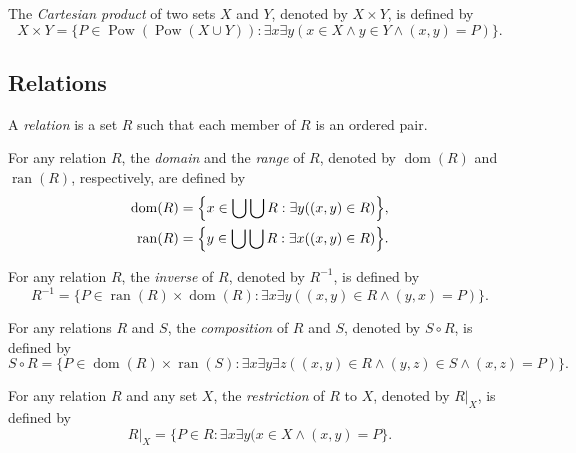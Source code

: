 \documentclass[11pt]{article}
\DeclareMathOperator{\pow}{Pow}
\DeclareMathOperator{\dom}{dom}
\DeclareMathOperator{\ran}{ran}
\begin{document}
\begin{definition}
  The \emph{Cartesian product} of two sets $X$ and $Y$, denoted by $X \times Y$, is defined by
  \begin{equation*}
    X \times Y = \{P \in \pow(\pow(X \cup Y)): \exists x \exists y (x \in X \wedge y \in Y \wedge (x, y) = P)\}.
  \end{equation*}
\end{definition}

\subsection{Relations}
\begin{definition}
  A \emph{relation} is a set $R$ such that each member of $R$ is an ordered pair.
\end{definition}

\begin{definition}
  For any relation $R$, the \emph{domain} and the \emph{range} of $R$, denoted by $\dom(R)$ and $\ran(R)$, respectively, are defined by
  \begin{align*}
    \dom(R) &= \Bigl\{x \in \bigcup \bigcup R: \exists y ((x, y) \in R) \Bigr\}, \\
    \ran(R) &= \Bigl\{y \in \bigcup \bigcup R: \exists x ((x, y) \in R) \Bigr\}.
  \end{align*}
\end{definition}

\begin{definition}
  For any relation $R$, the \emph{inverse} of $R$, denoted by $R^{-1}$, is defined by
  \begin{equation*}
    R^{-1} = \{P \in \ran(R) \times \dom(R): \exists x \exists y ((x, y) \in R \wedge (y, x) = P)\}.
  \end{equation*}
\end{definition}

\begin{definition}
  For any relations $R$ and $S$, the \emph{composition} of $R$ and $S$, denoted by $S \circ R$, is defined by
  \begin{equation*}
    S \circ R = \{P \in \dom(R) \times \ran(S): \exists x \exists y \exists z ((x, y) \in R \wedge (y, z) \in S \wedge (x, z) = P)\}.
  \end{equation*}
\end{definition}

\begin{definition}
  For any relation $R$ and any set $X$, the \emph{restriction} of $R$ to $X$, denoted by $R|_X$, is defined by
  \begin{equation*}
    R|_X = \{P \in R: \exists x \exists y (x \in X \wedge (x, y) = P\}.
  \end{equation*}
\end{definition}
\end{document}
